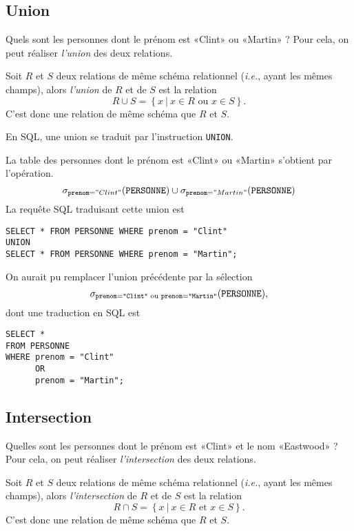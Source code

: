 \subsection{Union}
Quels sont les personnes dont le prénom est «Clint» ou «Martin» ? Pour cela, on peut réaliser  \emph{l'union} des deux relations.

\begin{defi}[Union]
  Soit $R$ et $S$ deux relations de même schéma relationnel (\emph{i.e.}, ayant les mêmes champs), alors \emph{l'union} de $R$ et de $S$ est la relation 
  \begin{equation*}
    R\cup S = \left\{x ~|~ x\in R\textrm{ ou }x\in S\right\}.
  \end{equation*}
  C'est donc une relation de même schéma que $R$ et $S$.
\end{defi}

En SQL, une union se traduit par l'instruction \texttt{UNION}.
\begin{exemple}
La table des personnes dont le prénom est «Clint» ou «Martin» s'obtient par l'opération.
\begin{equation*}
  \sigma_{\mathtt{prenom}="Clint"}(\mathtt{PERSONNE})\cup \sigma_{\mathtt{prenom}="Martin"}(\mathtt{PERSONNE})
\end{equation*}
La requête SQL traduisant cette union est 
\begin{verbatim}
SELECT * FROM PERSONNE WHERE prenom = "Clint"
UNION
SELECT * FROM PERSONNE WHERE prenom = "Martin";
\end{verbatim}
\end{exemple}
\begin{rem}
  On aurait pu remplacer l'union précédente par la sélection 
  \begin{equation*}
    \sigma_{\mathtt{prenom}=\texttt{"Clint"}\textrm{ ou }\mathtt{prenom}=\texttt{"Martin"}}(\mathtt{PERSONNE}),
  \end{equation*}
  dont une traduction en SQL est 
\begin{verbatim}
SELECT * 
FROM PERSONNE
WHERE prenom = "Clint"
      OR 
      prenom = "Martin";
\end{verbatim}
\end{rem}

\subsection{Intersection}

Quelles sont les personnes dont le prénom est «Clint» et le nom
«Eastwood» ? Pour cela, on peut réaliser  \emph{l'intersection} des deux relations.
\begin{defi}[Intersection]
  Soit $R$ et $S$ deux relations de même schéma relationnel (\emph{i.e.}, ayant les mêmes champs), alors \emph{l'intersection} de $R$ et de $S$ est la relation 
  \begin{equation*}
    R\cap S = \left\{x ~|~ x\in R\textrm{ et }x\in S\right\}.
  \end{equation*}
  C'est donc une relation de même schéma que $R$ et $S$.
\end{defi}

